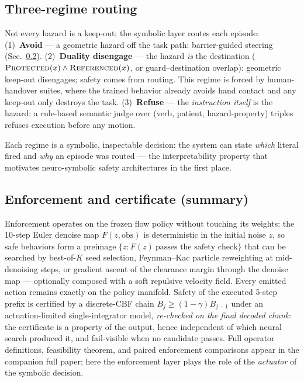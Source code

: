 \documentclass[conference]{IEEEtran}
\begin{document}
\subsection{Three-regime routing}
\label{sec:routing}

Not every hazard is a keep-out; the symbolic layer routes each episode:
(1)~\textbf{Avoid} --- a geometric hazard off the task path: barrier-guided steering (Sec.~\ref{sec:enforce}).
(2)~\textbf{Duality disengage} --- the hazard \emph{is} the destination ($\textsc{Protected}(x)\wedge\textsc{Referenced}(x)$, or guard--destination overlap): geometric keep-out disengages; safety comes from routing. This regime is forced by human-handover suites, where the trained behavior already avoids hand contact and any keep-out only destroys the task.
(3)~\textbf{Refuse} --- the \emph{instruction itself} is the hazard: a rule-based semantic judge over (verb, patient, hazard-property) triples refuses execution before any motion.

Each regime is a symbolic, inspectable decision: the system can state \emph{which} literal fired and \emph{why} an episode was routed --- the interpretability property that motivates neuro-symbolic safety architectures in the first place.

\subsection{Enforcement and certificate (summary)}
\label{sec:enforce}

Enforcement operates on the frozen flow policy without touching its weights: the 10-step Euler denoise map $F(z,\mathrm{obs})$ is deterministic in the initial noise $z$, so safe behaviors form a preimage $\{z: F(z)\ \text{passes the safety check}\}$ that can be searched by best-of-$K$ seed selection, Feynman--Kac particle reweighting at mid-denoising steps, or gradient ascent of the clearance margin through the denoise map --- optionally composed with a soft repulsive velocity field. Every emitted action remains exactly on the policy manifold. Safety of the executed 5-step prefix is certified by a discrete-CBF chain $B_j\ge(1-\gamma)B_{j-1}$ under an actuation-limited single-integrator model, \emph{re-checked on the final decoded chunk}: the certificate is a property of the output, hence independent of which neural search produced it, and fail-visible when no candidate passes. Full operator definitions, feasibility theorem, and paired enforcement comparisons appear in the companion full paper; here the enforcement layer plays the role of the \emph{actuator} of the symbolic decision.
\end{document}
